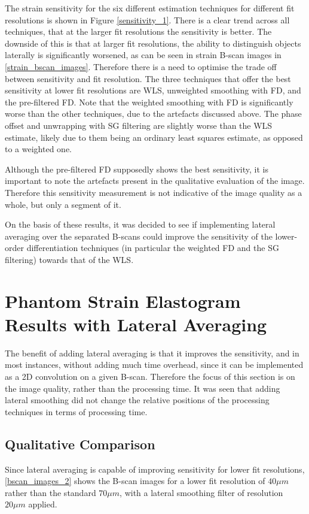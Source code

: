 The strain sensitivity for the six different estimation techniques for different fit resolutions is shown in Figure \autoref{sensitivity_1}. There is a clear trend across all techniques, that at the larger fit resolutions the sensitivity is better. The downside of this is that at larger fit resolutions, the ability to distinguish objects laterally is significantly worsened, as can be seen in strain B-scan images in \autoref{strain_bscan_images}. Therefore there is a need to optimise the trade off between sensitivity and fit resolution. The three techniques that offer the best sensitivity at lower fit resolutions are WLS, unweighted smoothing with FD, and the pre-filtered FD. Note that the weighted smoothing with FD is significantly worse than the other techniques, due to the artefacts discussed above. The phase offset and unwrapping with SG filtering are slightly worse than the WLS estimate, likely due to them being an ordinary least squares estimate, as opposed to a weighted one.

Although the pre-filtered FD supposedly shows the best sensitivity, it is important to note the artefacts present in the qualitative evaluation of the image. Therefore this sensitivity measurement is not indicative of the image quality as a whole, but only a segment of it.

On the basis of these results, it was decided to see if implementing lateral averaging over the separated B-scans could improve the sensitivity of the lower-order differentiation techniques (in particular the weighted FD and the SG filtering) towards that of the WLS. 

\section{Phantom Strain Elastogram Results with Lateral Averaging}\label{phantom_results_lateral}
The benefit of adding lateral averaging is that it improves the sensitivity, and in most instances, without adding much time overhead, since it can be implemented as a 2D convolution on a given B-scan. Therefore the focus of this section is on the image quality, rather than the processing time. It was seen that adding lateral smoothing did not change the relative positions of the processing techniques in terms of processing time.

\subsection{Qualitative Comparison}
Since lateral averaging is capable of improving sensitivity for lower fit resolutions, \autoref{bscan_images_2} shows the B-scan images for a lower fit resolution of $40\mu m$ rather than the standard $70\mu m$, with a lateral smoothing filter of resolution $20\mu m$ applied. 

